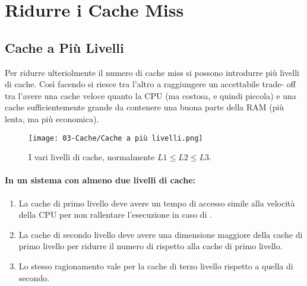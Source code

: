 \section{Ridurre i Cache Miss}

\subsection{Cache a Più Livelli}

Per ridurre ulteriolmente il numero di cache miss si possono introdurre più livelli di cache. Così facendo si riesce tra l’altro a raggiungere un accettabile trade-
off tra l’avere una cache veloce quanto la CPU (ma costosa, e quindi
piccola) e una cache sufficientemente grande da contenere una buona
parte della RAM (più lenta, ma più economica).

\begin{figure}[!h]
    \centering
    \texttt{[image: 03-Cache/Cache a più livelli.png]}
    \caption{I vari livelli di cache, normalmente $L1 \leq L2 \leq L3$.}
\end{figure}


\paragraph{In un sistema con almeno due livelli di cache:}

\begin{enumerate}
  \item La cache di primo livello deve avere un tempo di accesso simile alla velocità della CPU per non rallentare l'esecuzione in caso di . 
  \item La cache di secondo livello deve avere una dimensione maggiore della cache di primo livello per ridurre il  numero di  rispetto alla cache di primo livello. 
  \item Lo stesso ragionamento vale per la cache di terzo livello rispetto a quella di secondo. 
\end{enumerate}

